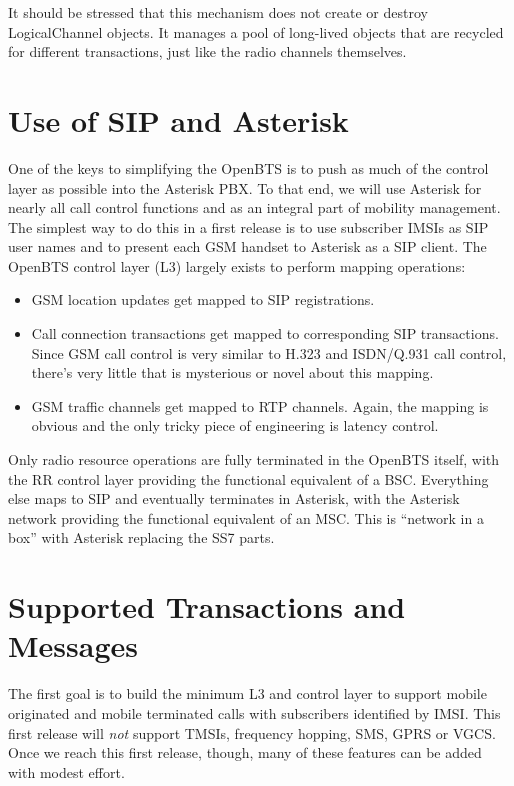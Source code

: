 \documentclass[11pt]{book}
\begin{document}
It should be stressed that this mechanism does not create or destroy LogicalChannel objects. It manages a pool of long-lived objects that are recycled for different transactions, just like the radio channels themselves.




\section{Use of SIP and Asterisk}
One of the keys to simplifying the OpenBTS is to push as much of the control layer as possible into the Asterisk PBX.  To that end, we will use Asterisk for nearly all call control functions and as an integral part of mobility management.  The simplest way to do this in a first release is to use subscriber IMSIs as SIP user names and to present each GSM handset to Asterisk as a SIP client.  The OpenBTS control layer (L3) largely exists to perform mapping operations:
\begin{itemize}
	\item GSM location updates get mapped to SIP registrations.
	\item Call connection transactions get mapped to corresponding SIP transactions.  Since GSM call control is very similar to H.323 and ISDN/Q.931 call control, there's very little that is mysterious or novel about this mapping.
	\item GSM traffic channels get mapped to RTP channels.  Again, the mapping is obvious and the only tricky piece of engineering is latency control.
\end{itemize}

Only radio resource operations are fully terminated in the OpenBTS itself, with the RR control layer providing the functional equivalent of a BSC.  Everything else maps to SIP and eventually terminates in Asterisk, with the Asterisk network providing the functional equivalent of an MSC.  This is ``network in a box'' with Asterisk replacing the SS7 parts.


\section{Supported Transactions and Messages}
\label{sec:transactions}
The first goal is to build the minimum L3 and control layer to support mobile originated and mobile terminated calls with subscribers identified by IMSI.  This first release will \emph{not} support TMSIs, frequency hopping, SMS, GPRS or VGCS.  Once we reach this first release, though, many of these features can be added with modest effort.
\end{document}
